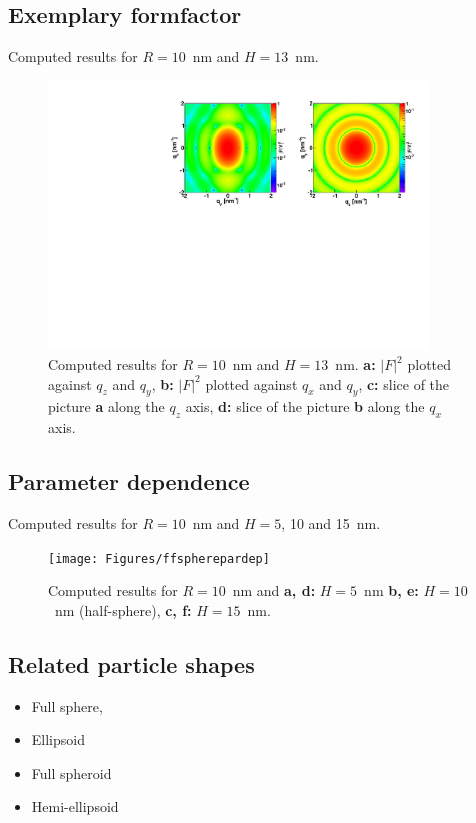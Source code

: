\subsection{Exemplary formfactor}
Computed results for $R=10$~nm and $H=13$~nm.
\begin{figure}[h]
\begin{center}
\includegraphics[width=0.9\textwidth]{Figures/figffsphere}
\end{center}
\caption{Computed results for $R=10$~nm and $H=13$~nm. {\bf a:} $|F|^2$ plotted against $q_z$ and $q_y$, {\bf b:} $|F|^2$ plotted against $q_x$ and $q_y$, {\bf c:} slice of the picture {\bf a} along the $q_z$ axis, {\bf d:} slice of the picture {\bf b} along the $q_x$ axis.}
\end{figure}

\par

\subsection{Parameter dependence}
Computed results for $R=10$~nm and $H=5$, 10 and 15~nm.
\begin{figure}[h]
\begin{center}
\texttt{[image: Figures/ffspherepardep]}
\end{center}
\caption{Computed results for $R=10$~nm and {\bf a, d:} $H=5$~nm {\bf b, e:} $H=10$~nm (half-sphere), {\bf c, f:} $H=15$~nm.}
\end{figure}


\subsection{Related particle shapes}
\begin{itemize}
\item Full sphere, 
\item Ellipsoid
\item Full spheroid
\item Hemi-ellipsoid
\end{itemize} 

